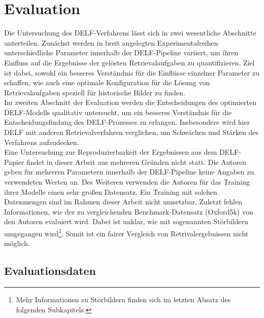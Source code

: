 \chapter{Evaluation}

Die Untersuchung des DELF-Verfahrens lässt sich in zwei wesentliche Abschnitte unterteilen. Zunächst werden in breit angelegten Experimentalreihen unterschiedliche Parameter innerhalb der DELF-Pipeline variiert, um ihren Einfluss auf die Ergebnisse der gelösten Retrievalaufgaben zu quantifizieren. Ziel ist dabei, sowohl ein besseres Verständnis für die Einflüsse einzelner Parameter zu schaffen, wie auch eine optimale Konfiguration für die Lösung von Retrievalaufgaben speziell für historische Bilder zu finden. \\
Im zweiten Abschnitt der Evaluation werden die Entscheidungen des optimierten DELF-Modells qualitativ untersucht, um ein besseres Verständnis für die Entscheidungsfindung des DELF-Prozesses zu erlangen. Insbesondere wird hier DELF mit anderen Retrievalverfahren verglichen, um Schwächen und Stärken des Verfahrens aufzudecken. \\
Eine Untersuchung zur Reproduzierbarkeit der Ergebnissen aus dem DELF-Papier \cite{delf} findet in dieser Arbeit aus mehreren Gründen nicht statt. Die Autoren geben für mehreren Parametern innerhalb der DELF-Pipeline keine Angaben zu verwendeten Werten an. Des Weiteren verwenden die Autoren für das Training ihrer Modelle einen sehr großen Datensatz. Ein Training mit solchen Datenmengen sind im Rahmen dieser Arbeit nicht umsetzbar. Zuletzt fehlen Informationen, wie der zu vergleichenden Benchmark-Datensatz (Oxford5k) von den Autoren evaluiert wird. Dabei ist unklar, wie mit sogenannten Störbildern umgegangen wird\footnote{Mehr Informationen zu Störbildern finden sich im letzten Absatz des folgenden Subkapitels.}. Somit ist ein fairer Vergleich von Retrivalergebnissen nicht möglich.

\section{Evaluationsdaten}

